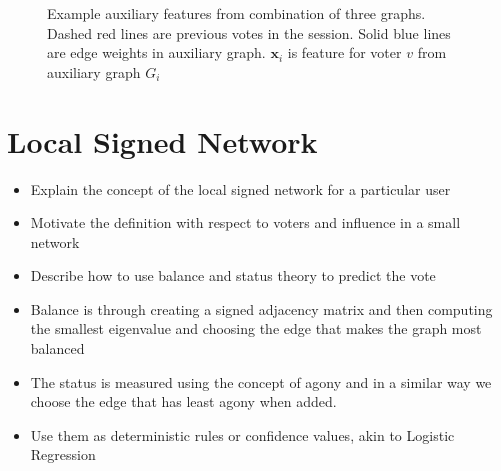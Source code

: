 \begin{figure}[!ht]
    \centering
    
    \caption{Example auxiliary features from combination of three graphs. Dashed red lines are previous votes in the session. Solid blue lines are edge weights in auxiliary graph. $\mathbf{x}_i$ is feature for voter $v$ from auxiliary graph $G_i$}
    \label{fig:linear-combination of graphs}
\end{figure}



\section{Local Signed Network}
\label{sec:local-signed-network}
\begin{itemize}
    \item Explain the concept of the local signed network for a particular user
    \item Motivate the definition with respect to voters and influence in a small network
    \item Describe how to use balance and status theory to predict the vote
    \item Balance is through creating a signed adjacency matrix and then computing the smallest eigenvalue and choosing the edge that makes the graph most balanced
    \item The status is measured using the concept of agony and in a similar way we choose the edge that has least agony when added.
    \item Use them as deterministic rules or confidence values, akin to Logistic Regression
\end{itemize}